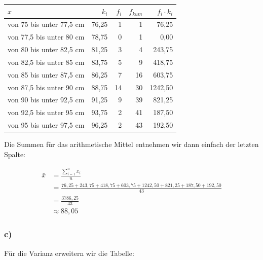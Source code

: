 \documentclass[
  11pt,
  ngerman,
  a4paper,
]{report}
\begin{document}
\begin{table}[H]
\centering
\begin{tabular}{lrrrr}
\toprule
\textbf{$x$} & \textbf{$k_i$} & \textbf{$f_i$} & \textbf{$f_{kum}$} & \textbf{$f_i \cdot k_i$}\\
\midrule
von 75 bis unter 77,5 cm & 76,25 & 1 & 1 & 76,25\\
von 77,5 bis unter 80 cm & 78,75 & 0 & 1 & 0,00\\
von 80 bis unter 82,5 cm & 81,25 & 3 & 4 & 243,75\\
von 82,5 bis unter 85 cm & 83,75 & 5 & 9 & 418,75\\
von 85 bis unter 87,5 cm & 86,25 & 7 & 16 & 603,75\\
von 87,5 bis unter 90 cm & 88,75 & 14 & 30 & 1242,50\\
von 90 bis unter 92,5 cm & 91,25 & 9 & 39 & 821,25\\
von 92,5 bis unter 95 cm & 93,75 & 2 & 41 & 187,50\\
von 95 bis unter 97,5 cm & 96,25 & 2 & 43 & 192,50\\
\bottomrule
\end{tabular}
\end{table}

Die Summen für das arithmetische Mittel entnehmen wir dann einfach der letzten Spalte:

\[\begin{aligned}
  \bar{x}&=\frac{\sum\limits_{i=1}^nx_i}{n} \\
         &=\frac{76{,}25+ 243{,}75+ 418{,}75+ 603{,}75+1242{,}50+ 821{,}25+ 187{,}50+ 192{,}50}{43} \\
         &=\frac{3786{,}25}{43} \\
         &\approx88{,}05
\end{aligned}\]

\hypertarget{c-5}{%
\subsubsection{c)}\label{c-5}}

Für die Varianz erweitern wir die Tabelle:
\end{document}
